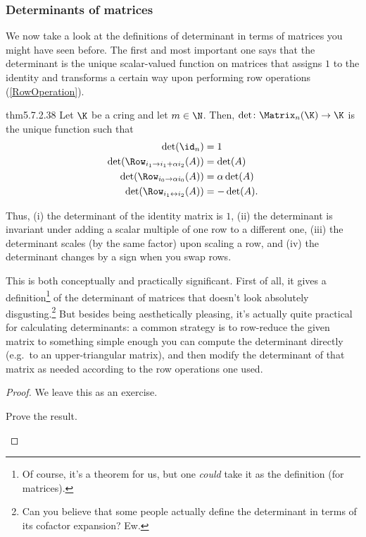 \subsubsection{Determinants of matrices}

We now take a look at the definitions of determinant in terms of matrices you might have seen before.  The first and most important one says that the determinant is the unique scalar-valued function on matrices that assigns $1$ to the identity and transforms a certain way upon performing row operations (\cref{RowOperation}).
\begin{thm}{}{thm5.7.2.38}
	Let $\K$ be a cring and let $m\in \N$.  Then, $\det \colon \Matrix _n(\K )\rightarrow \K$ is the unique function such that
	\begin{align}
		\det (\id _n) & =1 \\
		\det (\Row _{i_1\rightarrow i_1+\alpha i_2}(A)) & =\det (A) \\
		\det (\Row _{i_0\rightarrow \alpha i_0}(A)) & =\alpha \det (A) \\
		\det (\Row _{i_1\leftrightarrow i_2}(A)) & =-\det (A).
	\end{align}
	\begin{rmk}
		Thus, (i) the determinant of the identity matrix is $1$, (ii) the determinant is invariant under adding a scalar multiple of one row to a different one, (iii) the determinant scales (by the same factor) upon scaling a row, and (iv) the determinant changes by a sign when you swap rows.
	\end{rmk}
	\begin{rmk}
		This is both conceptually and practically significant.  First of all, it gives a definition\footnote{Of course, it's a theorem for us, but one \emph{could} take it as the definition (for matrices).} of the determinant of matrices that doesn't look absolutely disgusting.\footnote{Can you believe that some people actually define the determinant in terms of its cofactor expansion?  Ew.}  But besides being aesthetically pleasing, it's actually quite practical for calculating determinants:  a common strategy is to row-reduce the given matrix to something simple enough you can compute the determinant directly (e.g.~to an upper-triangular matrix), and then modify the determinant of that matrix as needed according to the row operations one used.
	\end{rmk}
	\begin{proof}
		We leave this as an exercise.
		\begin{exr}[breakable=false]{}{}
			Prove the result.
		\end{exr}
	\end{proof}
\end{thm}
